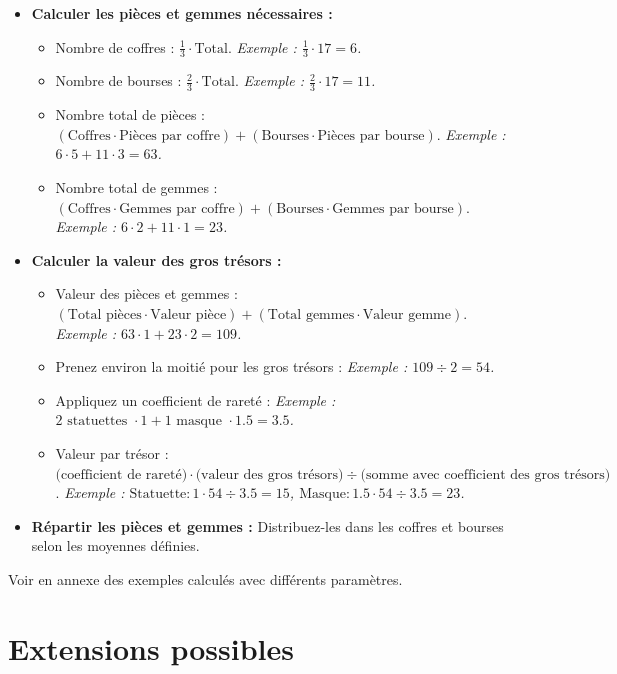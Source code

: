 \documentclass{pirategame}
\begin{document}
\begin{itemize}
  \item \textbf{Calculer les pièces et gemmes nécessaires :}
  \begin{itemize}
    \item Nombre de coffres : \(\frac{1}{3} \cdot \text{Total}\).  
    \textit{Exemple : \(\frac{1}{3} \cdot 17 = 6\).}
    \item Nombre de bourses : \(\frac{2}{3} \cdot \text{Total}\).  
    \textit{Exemple : \(\frac{2}{3} \cdot 17 = 11\).}
    \item Nombre total de pièces : \((\text{Coffres} \cdot \text{Pièces par coffre}) + (\text{Bourses} \cdot \text{Pièces par bourse})\).  
    \textit{Exemple : \(6 \cdot 5 + 11 \cdot 3 = 63\).}
    \item Nombre total de gemmes : \((\text{Coffres} \cdot \text{Gemmes par coffre}) + (\text{Bourses} \cdot \text{Gemmes par bourse})\).  
    \textit{Exemple : \(6 \cdot 2 + 11 \cdot 1 = 23\).}
  \end{itemize}

  \item \textbf{Calculer la valeur des gros trésors :}
  \begin{itemize}
    \item Valeur des pièces et gemmes : \((\text{Total pièces} \cdot \text{Valeur pièce}) + (\text{Total gemmes} \cdot \text{Valeur gemme})\).  
    \textit{Exemple : \(63 \cdot 1 + 23 \cdot 2 = 109\).}
    \item Prenez environ la moitié pour les gros trésors :  
    \textit{Exemple : \(109 \div 2 = 54\).}
    \item Appliquez un coefficient de rareté :  
    \textit{Exemple : \(2 \text{ statuettes } \cdot 1 + 1 \text{ masque } \cdot 1.5 = 3.5\).}
    \item Valeur par trésor : \(\text{(coefficient de rareté)} \cdot \text{(valeur des gros trésors)} \div \text{(somme avec coefficient des gros trésors)}\).
    \textit{Exemple : \(\text{Statuette} : 1 \cdot 54 \div 3.5 = 15\), \(\text{Masque} : 1.5 \cdot 54 \div 3.5 = 23\).}
  \end{itemize}

  \item \textbf{Répartir les pièces et gemmes :}  
  Distribuez-les dans les coffres et bourses selon les moyennes définies.

\end{itemize}

Voir en annexe des exemples calculés avec différents paramètres.

\section{Extensions possibles}
\end{document}

